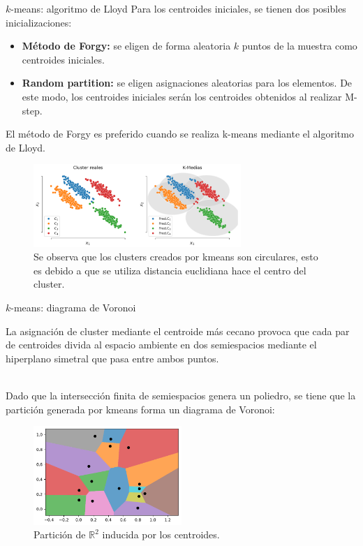 \documentclass[9pt]{beamer}
\begin{document}
\begin{frame}{$k$-means: algoritmo de Lloyd}
	Para los centroides iniciales, se tienen dos posibles inicializaciones:

\begin{itemize}
	\item \textbf{Método de Forgy:} se eligen de forma aleatoria $k$ puntos de la muestra como centroides iniciales.\pause
	\item \textbf{Random partition:} se eligen asignaciones aleatorias para los elementos. De este modo, los centroides iniciales serán los centroides obtenidos al realizar M-step.\pause
\end{itemize}

El método de Forgy es preferido cuando se realiza k-means mediante el algoritmo de Lloyd.\pause

\begin{figure}[h]
  \centering
  \includegraphics[width=0.7\textwidth]{../img/cap6_k_medias}
  \caption{Se observa que los clusters creados por kmeans son circulares, esto es debido a que se utiliza distancia euclidiana hace el centro del cluster.}
  \label{fig:kmeans}
\end{figure}

\end{frame}


\begin{frame}{$k$-means: diagrama de Voronoi}
	
La asignación de cluster mediante el centroide más cecano provoca que cada par de centroides divida al espacio ambiente en dos semiespacios mediante el hiperplano simetral que pasa entre ambos puntos. \\~\ \pause

Dado que la intersección finita de semiespacios genera un poliedro, se tiene que la partición generada por kmeans forma un diagrama de Voronoi:

\begin{figure}[h]
  \centering
  \includegraphics[width=0.5\textwidth]{../img/cap6_voronoi}
  \caption{Partición de $\mathbb{R}^2$ inducida por los centroides.}
  \label{fig:kmeans}
\end{figure}

\end{frame}
\end{document}
